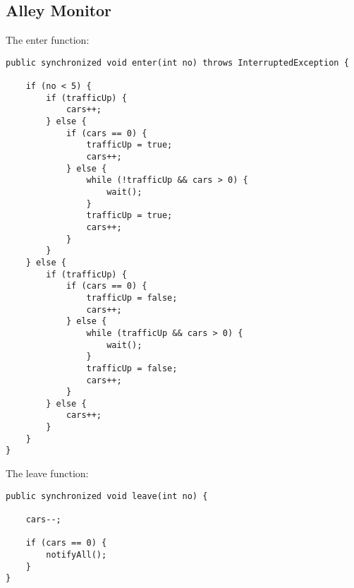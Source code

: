 \subsection{Alley Monitor}
\label{sec:alleymonitor}
The enter function:
\begin{lstlisting}
public synchronized void enter(int no) throws InterruptedException {

	if (no < 5) {
		if (trafficUp) {
			cars++;
		} else {
			if (cars == 0) {
				trafficUp = true;
				cars++;
			} else {
				while (!trafficUp && cars > 0) {
					wait();
				}
				trafficUp = true;
				cars++;
			}
		}
	} else {
		if (trafficUp) {
			if (cars == 0) {
				trafficUp = false;
				cars++;
			} else {
				while (trafficUp && cars > 0) {
					wait();
				}
				trafficUp = false;
				cars++;
			}
		} else {
			cars++;
		}
	}
}
\end{lstlisting}
The leave function:
\begin{lstlisting}
public synchronized void leave(int no) {

	cars--;

	if (cars == 0) {
		notifyAll();
	}
}
\end{lstlisting}
